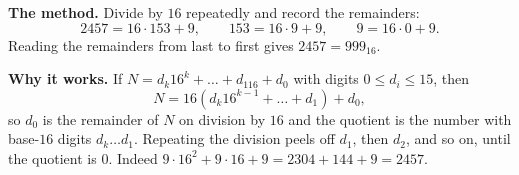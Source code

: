 \textbf{The method.} Divide by $16$ repeatedly and record the remainders:
\[
2457=16\cdot153+9,\qquad 153=16\cdot9+9,\qquad 9=16\cdot0+9 .
\]
Reading the remainders from last to first gives $2457=\boxed{999_{16}}$.

\textbf{Why it works.} If $N=d_k16^k+\dots+d_116+d_0$ with digits $0\le d_i\le15$, then
\[
N=16\left(d_k16^{k-1}+\dots+d_1\right)+d_0 ,
\]
so $d_0$ is the remainder of $N$ on division by $16$ and the quotient is the number with base-$16$ digits $d_k\ldots d_1$. Repeating the division peels off $d_1$, then $d_2$, and so on, until the quotient is $0$. Indeed $9\cdot16^2+9\cdot16+9=2304+144+9=2457$.
